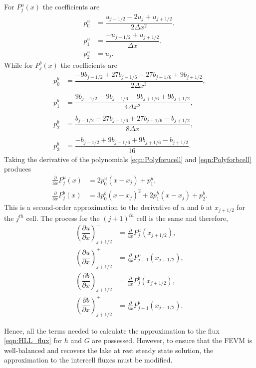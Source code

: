 For $P^u_j(x)$ the coefficients are
\begin{align*}
p^u_0 &=  \dfrac{u_{j-1/2} - 2u_j + u_{j+1/2}}{2 \Delta x^2},\\
p^u_1 &=  \dfrac{-u_{j-1/2} + u_{j+1/2}}{\Delta x},\\
p^u_2 &=  u_j.
\end{align*}
While for $P^b_j(x)$ the coefficients are
\begin{align*}
p^b_0 &=  \dfrac{-9b_{j-1/2} + 27b_{j-1/6} - 27 b_{j+1/6} + 9b_{j+1/2}}{2 \Delta x^3},\\ \\
p^b_1 &=  \dfrac{9b_{j-1/2} - 9b_{j-1/6} - 9b_{j+1/6} + 9b_{j+1/2}}{4 \Delta x^2},\\ \\ 
p^b_2 &=  \dfrac{b_{j-1/2} - 27b_{j-1/6} + 27 b_{j+1/6} - b_{j+1/2}}{8 \Delta x},\\\\
p^b_3 &=  \dfrac{-b_{j-1/2}  + 9b_{j-1/6} + 9 b_{j+1/6} - b_{j+1/2}}{16}.
\end{align*}
Taking the derivative of the polynomials \eqref{eqn:Polyforucell} and \eqref{eqn:Polyforbcell} produces
	\begin{align*}
	\frac{\partial }{\partial x}P^u_j(x) &= 2p^u_0 \left(x - x_j\right) + p^u_1, \\
	\frac{\partial }{\partial x}P^b_j(x) &= 3p^b_0 \left(x - x_j\right)^2 + 2p^b_1 \left(x - x_j\right) + p^b_2.
	\end{align*}
This is a second-order approximation to the derivative of $u$ and $b$ at $x_{j+1/2}$ for the $j^{th}$ cell. The process for the $(j+1)^{th}$ cell is the same and therefore, 
	\begin{align*}
	\left(\dfrac{\partial {u}}{\partial x} \right)^-_{j + 1/2} &= \frac{\partial }{\partial x}P^u_j(x_{j+1/2}),  \\
	\left(\dfrac{\partial {u}}{\partial x} \right)^+_{j + 1/2} &= \frac{\partial }{\partial x}P^u_{j+1}(x_{j+1/2}),  \\
	\left(\dfrac{\partial {b}}{\partial x} \right)^-_{j + 1/2} &= \frac{\partial }{\partial x}P^b_j(x_{j+1/2}), \\
	\left(\dfrac{\partial {b}}{\partial x} \right)^+_{j + 1/2} &= \frac{\partial }{\partial x}P^b_{j+1}(x_{j+1/2}). 	\end{align*}

Hence, all the terms needed to calculate the approximation to the flux \eqref{eqn:HLL_flux} for $h$ and $G$ are possessed. However, to ensure that the FEVM is well-balanced and recovers the lake at rest steady state solution, the approximation to the intercell fluxes must be modified.

